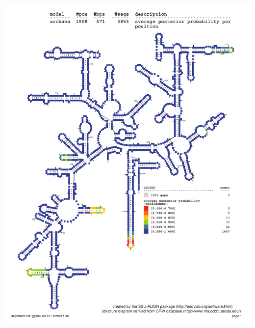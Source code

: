 \documentclass[landscape]{slides}
\begin{document}
\begin{slide}\begin{center}\includegraphics[height=8in]{figs/ggsilR-arc-f97-archaea-prob}\end{center}\vfill\end{slide}
\end{document}
